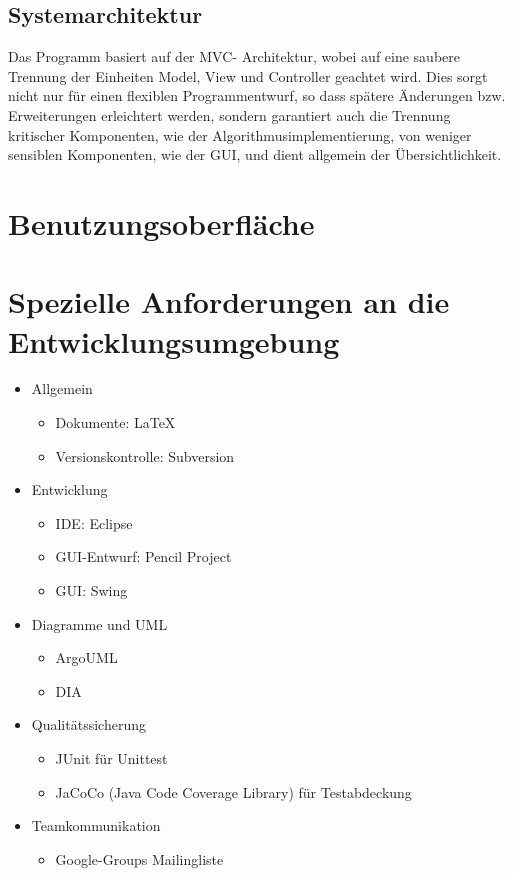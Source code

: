 \documentclass[10pt,a4paper]{article}
\begin{document}
\subsection{Systemarchitektur}
Das Programm basiert auf der MVC- Architektur, wobei auf eine saubere Trennung der Einheiten Model, View und Controller geachtet wird. Dies sorgt nicht nur für einen flexiblen Programmentwurf, so dass spätere Änderungen bzw. Erweiterungen erleichtert werden, sondern garantiert auch die Trennung kritischer Komponenten, wie der Algorithmusimplementierung, von weniger sensiblen Komponenten, wie der GUI, und dient allgemein der Übersichtlichkeit.

\section{Benutzungsoberfläche}

\section{Spezielle Anforderungen an die Entwicklungsumgebung}
\begin{itemize}
	\item Allgemein
	\begin{itemize}
		\item Dokumente: \LaTeX
		\item Versionskontrolle: Subversion
	\end{itemize}
	\item Entwicklung
	\begin{itemize}
		\item IDE: Eclipse
		\item GUI-Entwurf: Pencil Project
		\item GUI: Swing
	\end{itemize}
	\item Diagramme und UML
	\begin{itemize}
		\item ArgoUML
		\item DIA
	\end{itemize}
	\item Qualitätssicherung
	\begin{itemize}
		\item JUnit für Unittest
		\item JaCoCo (Java Code Coverage Library) für Testabdeckung
	\end{itemize}
	\item Teamkommunikation
	\begin{itemize}
		\item Google-Groups Mailingliste
	\end{itemize}
\end{itemize}
\end{document}
